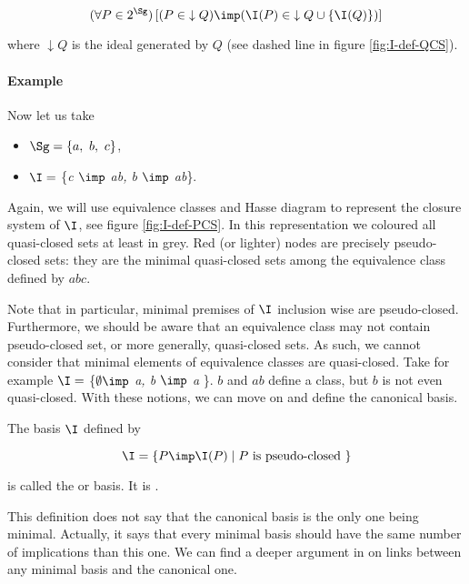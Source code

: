 \[ (\forall P \in 2^{\Sg})\left[( P \in \; \downarrow Q) \imp (\I(P) \in \; 
\downarrow Q \cup \{\I(Q)\})\right] \]

\noindent where $\downarrow Q$ is the ideal generated by $Q$ (see dashed line
in figure \ref{fig:I-def-QCS}). 

\newpage

\paragraph{Example} Now let us take 
\begin{itemize}
	\item $\Sg = \{a, \ b, \ c \}$,
	\item $\I = $ \{\textit{c $\imp$ ab, b $\imp$ ab}\}.
\end{itemize}
Again, we will use equivalence classes and Hasse diagram to represent the 
closure system of $\I$, see figure \ref{fig:I-def-PCS}. In this representation
we coloured all quasi-closed sets at least in grey. Red (or lighter) nodes are
precisely pseudo-closed sets: they are the minimal quasi-closed sets among the
equivalence class defined by $abc$. 

\begin{figure}[ht]
	
\end{figure}

Note that in particular, minimal premises of $\I$ inclusion wise are 
pseudo-closed. Furthermore, we should be aware that an equivalence class may
not contain pseudo-closed set, or more generally, quasi-closed sets. As such,
we cannot consider that minimal elements of equivalence classes are 
quasi-closed. Take for example $\I =$ \{\textit{$\emptyset \imp $ a, b $\imp$ a 
}\}. $b$ and $ab$ define a class, but $b$ is not even quasi-closed. With these
notions, we can move on and define the canonical basis.

\begin{definition} The basis $\I$ defined by
	
	\[ \I = \{ P \imp \I(P) \; | \; P \text{ is pseudo-closed } \} \]
	
	\noindent is called the  or  
	basis. 
	It is .
	
\end{definition}

\noindent This definition does not say that the canonical basis is the only one
being minimal. Actually, it says that every minimal basis should have the same
number of implications than this one. We can find a deeper argument in 
\cite{b._ganter_conceptual_2016} on links between any minimal basis and the 
canonical one.

